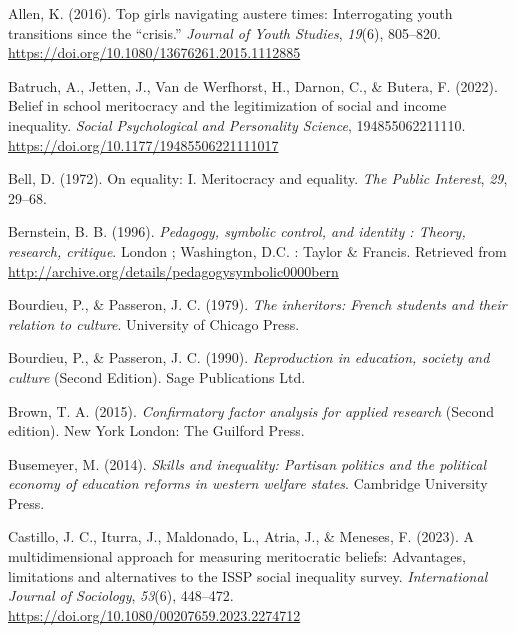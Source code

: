\documentclass[
  13pt,
]{article}
\newlength{\cslhangindent}
\newenvironment{CSLReferences}[2] %
 {\begin{list}{}{%
  \setlength{\itemindent}{0pt}
  \setlength{\leftmargin}{0pt}
  \setlength{\parsep}{0pt}
  \ifodd #1
   \setlength{\leftmargin}{\cslhangindent}
   \setlength{\itemindent}{-1\cslhangindent}
  \fi
  \setlength{\itemsep}{#2\baselineskip}}}
 {\end{list}}
\begin{document}
\label{refs}
\begin{CSLReferences}{1}{0}
Allen, K. (2016). Top girls navigating austere times: Interrogating
youth transitions since the {``crisis.''} \emph{Journal of Youth
Studies}, \emph{19}(6), 805--820.
\url{https://doi.org/10.1080/13676261.2015.1112885}

Batruch, A., Jetten, J., Van de Werfhorst, H., Darnon, C., \& Butera, F.
(2022). Belief in school meritocracy and the legitimization of social
and income inequality. \emph{Social Psychological and Personality
Science}, 194855062211110.
\url{https://doi.org/10.1177/19485506221111017}

Bell, D. (1972). On equality: I. Meritocracy and equality. \emph{The
Public Interest}, \emph{29}, 29--68.

Bernstein, B. B. (1996). \emph{Pedagogy, symbolic control, and identity
: Theory, research, critique}. London ; Washington, D.C. : Taylor \&
Francis. Retrieved from
\url{http://archive.org/details/pedagogysymbolic0000bern}

Bourdieu, P., \& Passeron, J. C. (1979). \emph{The inheritors: French
students and their relation to culture}. University of Chicago Press.

Bourdieu, P., \& Passeron, J. C. (1990). \emph{Reproduction in
education, society and culture} (Second Edition). Sage Publications Ltd.

Brown, T. A. (2015). \emph{Confirmatory factor analysis for applied
research} (Second edition). New York London: The Guilford Press.

Busemeyer, M. (2014). \emph{Skills and inequality: Partisan politics and
the political economy of education reforms in western welfare states}.
Cambridge University Press.

Castillo, J. C., Iturra, J., Maldonado, L., Atria, J., \& Meneses, F.
(2023). A multidimensional approach for measuring meritocratic beliefs:
Advantages, limitations and alternatives to the ISSP social inequality
survey. \emph{International Journal of Sociology}, \emph{53}(6),
448--472. \url{https://doi.org/10.1080/00207659.2023.2274712}


\end{CSLReferences}
\end{document}
